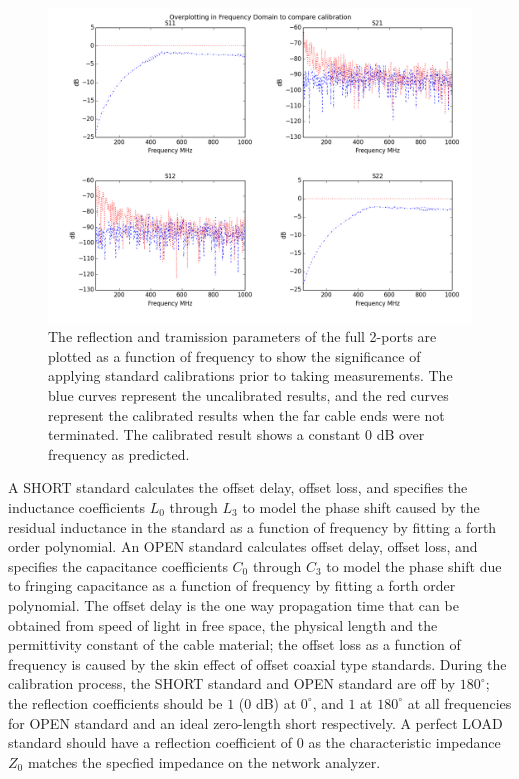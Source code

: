 \documentclass[preprint]{aastex}  %
\begin{document}
\begin{figure}[H]
	\begin{center}
	\includegraphics[width =\textwidth]{./reflectometry_plots/Calibration_open}
	\caption{The reflection and tramission parameters of the full 2-ports are plotted as a function of frequency to show the significance of applying standard calibrations prior to taking measurements. The blue curves represent the uncalibrated results, and the red curves represent the calibrated results when the far cable ends were not terminated. The calibrated result shows a constant $0$ dB over frequency as predicted.}
\label{Fig:calibration} 
	\end{center}
\end{figure}
\clearpage

A SHORT standard calculates the offset delay, offset loss, and specifies the inductance coefficients $L_0$ through $L_3$ to model the phase shift caused by the residual inductance in the standard as a function of frequency by fitting a forth order polynomial. An OPEN standard calculates offset delay, offset loss, and specifies the capacitance coefficients $C_{0}$ through $C_{3}$ to model the phase shift due to fringing capacitance as a function of frequency by fitting a forth order polynomial. The offset delay is the one way propagation time that can be obtained from speed of light in free space, the physical length and the permittivity constant of the cable material; the offset loss as a function of frequency is caused by the skin effect of offset coaxial type standards. During the calibration process, the SHORT standard and OPEN standard are off by $180^\circ$; the reflection coefficients should be $1$ (0 dB) at $0^\circ$, and $1$ at $180^\circ$ at all frequencies for OPEN standard and an ideal zero-length short respectively. A perfect LOAD standard should have a reflection coefficient of $0$ as the characteristic impedance $Z_0$ matches the specfied impedance on the network analyzer. 
\end{document}
